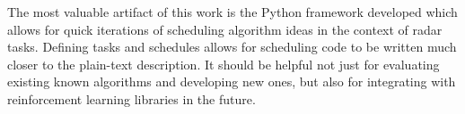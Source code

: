 \documentclass[conference]{IEEEtran}
\begin{document}
The most valuable artifact of this work is the Python framework developed which allows for quick iterations of scheduling algorithm ideas in the context of radar tasks.
Defining tasks and schedules allows for scheduling code to be written much closer to the plain-text description.
It should be helpful not just for evaluating existing known algorithms and developing new ones, but also for integrating with reinforcement learning libraries in the future.




\end{document}
